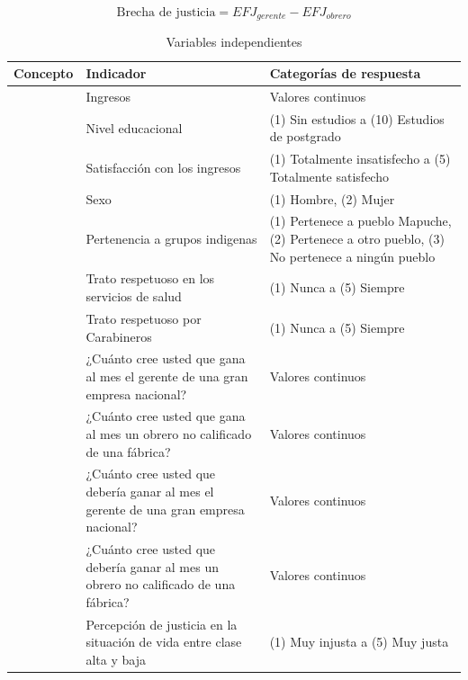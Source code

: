 \documentclass[12pt,twoside]{templates/facsothesis}
\begin{document}
\begin{equation}
   \text{Brecha de justicia}= EFJ_{gerente} - EFJ_{obrero} \label{eq:bj}
\end{equation}

\begin{table}[!h]

\caption{\label{tab:tab-indep}Variables independientes}
\centering
\fontsize{10}{12}\selectfont
\begin{tabu} to 
\toprule
Concepto & Indicador & Categorías de respuesta\\
\midrule
 & Ingresos & Valores continuos\\
 & Nivel educacional & (1) Sin estudios a (10) Estudios de postgrado\\
 & Satisfacción con los ingresos & (1) Totalmente insatisfecho a (5) Totalmente satisfecho\\
 & Sexo & (1) Hombre, (2) Mujer\\
 & Pertenencia a grupos indigenas & (1) Pertenece a pueblo Mapuche, (2) Pertenece a otro pueblo, (3) No pertenece a ningún pueblo\\
 & Trato respetuoso en los servicios de salud & (1) Nunca a (5) Siempre\\
 & Trato respetuoso por Carabineros & (1) Nunca a (5) Siempre\\
 & ¿Cuánto cree usted que gana al mes el gerente de una gran empresa nacional? & Valores continuos\\
 & ¿Cuánto cree usted que gana al mes un obrero no calificado de una fábrica? & Valores continuos\\
 & ¿Cuánto cree usted que debería ganar al mes el gerente de una gran empresa nacional? & Valores continuos\\
 & ¿Cuánto cree usted que debería ganar al mes un obrero no calificado de una fábrica? & Valores continuos\\
 & Percepción de justicia en la situación de vida entre clase alta y baja & (1) Muy injusta a (5) Muy justa\\
\bottomrule
\end{tabu}
\end{table}
\end{document}
